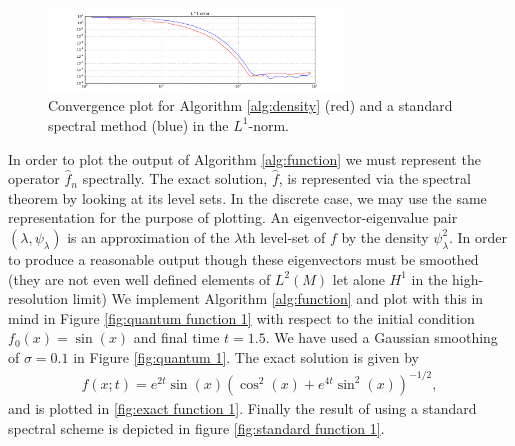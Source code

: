 \documentclass[final,leqno]{siamltex1213}
\begin{document}
\begin{figure}
	\centering
	\includegraphics[width=0.7\textwidth]{./images/convergence_plot.pdf}
	\caption{Convergence plot for Algorithm \ref{alg:density} (red) and a standard spectral method (blue) in the $L^{1}$-norm.}
	\label{fig:convergence}
\end{figure}

%


In order to plot the output of Algorithm \ref{alg:function} we must represent the operator $\hat{f}_{n}$ spectrally.
The exact solution, $\hat{f}$, is represented via the spectral theorem by looking at its level sets.
In the discrete case, we may use the same representation for the purpose of plotting.
An eigenvector-eigenvalue pair $(\lambda , \psi_{\lambda})$ is an approximation of the $\lambda$th level-set of $f$ by the density $\psi_{\lambda}^{2}$.
In order to produce a reasonable output though these eigenvectors must be smoothed (they are not even well defined elements of $L^{2}(M)$ let alone $H^{1}$ in the high-resolution limit)
We implement Algorithm \ref{alg:function} and plot with this in mind in Figure \ref{fig:quantum function 1} with respect to the initial condition $f_{0}(x) = \sin(x)$ and final time $t=1.5$.
We have used a Gaussian smoothing of $\sigma=0.1$ in Figure \ref{fig:quantum 1}.
The exact solution is given by 
\begin{align}
	f(x;t) = e^{2t} \sin(x) \left( \cos^{2}(x) + e^{4t} \sin^{2}(x) \right)^{-1/2},
\end{align}
and is plotted in \ref{fig:exact function 1}.
Finally the result of using a standard spectral scheme is depicted in figure \ref{fig:standard function 1}.
\end{document}
